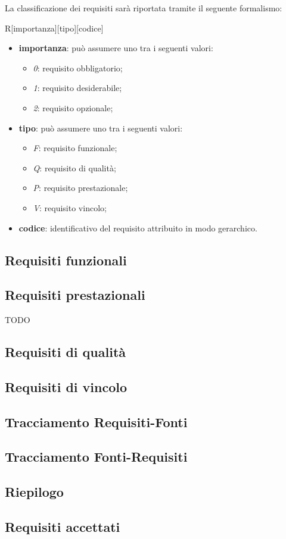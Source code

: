 La classificazione dei requisiti sarà riportata tramite il seguente formalismo:
\begin{center} 
R[importanza][tipo][codice]
\end{center}
\begin{itemize}
\item \textbf{importanza}: può assumere uno tra i seguenti valori:
	\begin{itemize}
	\item \emph{0}: requisito obbligatorio;
	\item \emph{1}: requisito desiderabile;
	\item \emph{2}: requisito opzionale;
	\end{itemize}
\item \textbf{tipo}: può assumere uno tra i seguenti valori:
	\begin{itemize}
	\item \emph{F}: requisito funzionale;
	\item \emph{Q}: requisito di qualità;
	\item \emph{P}: requisito prestazionale;
	\item \emph{V}: requisito vincolo;
	\end{itemize}
\item \textbf{codice}: identificativo del requisito attribuito in modo gerarchico.
\end{itemize}

\subsection{Requisiti funzionali}

\subsection{Requisiti prestazionali}

\begin{center}
\begin{small}
	\begin{tabbing}
		TODO
	\end{tabbing}
\end{small}
\end{center}

\subsection{Requisiti di qualità}

\subsection{Requisiti di vincolo}

\subsection{Tracciamento Requisiti-Fonti}

\subsection{Tracciamento Fonti-Requisiti}

\subsection{Riepilogo}

\subsection{Requisiti accettati}
